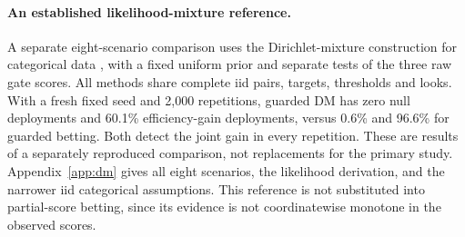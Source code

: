 \paragraph{An established likelihood-mixture reference.}
A separate eight-scenario comparison uses the Dirichlet-mixture
construction for categorical data \citep{lindon2022multinomial}, with a
fixed uniform prior and separate tests of the three raw gate scores.
All methods share complete iid pairs, targets, thresholds and looks.
With a fresh fixed seed and 2,000 repetitions, guarded DM has zero null
deployments and 60.1\% efficiency-gain deployments, versus 0.6\% and
96.6\% for guarded betting. Both detect the joint gain in every repetition.
These are results of a separately reproduced comparison, not replacements
for the primary study. Appendix~\ref{app:dm} gives all eight scenarios,
the likelihood derivation, and the narrower iid categorical assumptions.
This reference is not substituted into partial-score betting, since its
evidence is not coordinatewise monotone in the observed scores.
